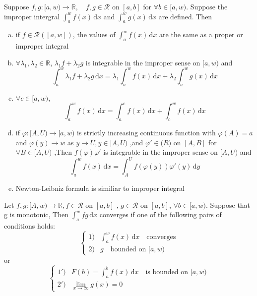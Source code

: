 

\begin{theorem}
    Suppose $ f,g:[a,w)\rightarrow  \mathbb{R}, \quad f,g\in \mathscr{R} $ on $ [a,b] $ for
    $ \forall b \in [a,w). $ Suppose the improper intergral $  \int_{a }^{w} f(x)\, \mathrm{d}x  $ 
    and $ \int_{a }^{w} g(x)\, \mathrm{d}x   $ are defined. Then
    \begin{enumerate}[a)]
        \item if $ f\in \mathscr{R}([a,w])$, the values of $ \int_{a }^{w} f(x)\, \mathrm{d}x   $ are the same as a proper or improper integral
        \item  $ \forall \lambda_1,\lambda_2\in \mathbb{R} $, $ \lambda_1 f+\lambda_2 g $ is integrable in the improper sense on $ [a,w) $ and\[\int_{a }^{w} \lambda_1 f+\lambda_2 g\, \mathrm{d}x=\lambda_1 \int_{a }^{w} f(x)\, \mathrm{d}x +\lambda_2 \int_{a }^{w} g(x)\, \mathrm{d}x     \] 
        \item $ \forall c\in [a,w), $ \[\int_{a }^{w} f(x)\, \mathrm{d}x=\int_{a }^{c} f(x)\, \mathrm{d}x+\int_{c }^{w} f(x)\, \mathrm{d}x     \]
        \item if $ \varphi  :[A,U)\rightarrow[a,w)$ is strictly increasing continuous function with $ \varphi(A)=a  $ and $ \varphi(y)\rightarrow w  $ as $ y\rightarrow U,y\in[A,U) $ ,and $ \varphi'\in \mathcal(R)  $ on $ [A,B] $ for $ \forall B\in [A,U)  $ ,Then
        $ f(\varphi)\varphi' $ is integrable in the improper sense on $ [A,U)  $ and \[\int_{a }^{w } f(x)\, \mathrm{d}x  =\int_{A }^{U } f(\varphi(y))\varphi'(y)\, \mathrm{d}y  \]
        \item Newton-Leibniz formula is similiar to improper integral  
    \end{enumerate} 

\end{theorem}

\begin{theorem}
    Let $ f,g:[A,w)\rightarrow \mathbb{R},f\in \mathscr{R} $ on $ [a,b] $ , $ g\in \mathscr{R} $ on $ [a,b] $, $ \forall b\in [a,w) $.
    Suppose that g is monotonic,    Then $\int_{a }^{w } fg\, \mathrm{d}x  $ converges if one of the following pairs of conditions holds:
        \[\begin{cases}
            1)&  \int_{a }^{w } f(x)\, \mathrm{d}x \quad  \text{converges} \\

            2)& g \quad \text{bounded on } [a,w) 
        \end{cases}
        \]
        or 
        \[
            \begin{cases}
                1')& F(b)=\int_{a }^{b } f(x)\, \mathrm{d}x \quad\text{is bounded on }[a,w)\\
                2')& \lim\limits_{x\to \infty} g(x)=0
            \end{cases}
        \]
    
\end{theorem}

